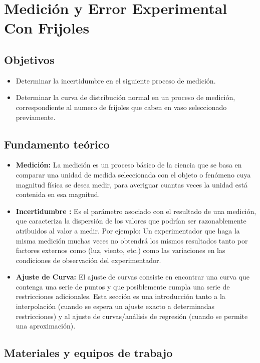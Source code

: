 \section{Medición y Error Experimental Con Frijoles}
\subsection{Objetivos}
\begin{itemize}
    \item Determinar la incertidumbre en el siguiente proceso de medición.
    \item Determinar la curva de distribución normal en un proceso de medición, correspondiente al numero de frijoles que caben en vaso seleccionado previamente.
\end{itemize}

\subsection{Fundamento teórico}
\begin{itemize}
    \item \textbf{Medición:} La medición es un proceso básico de la ciencia que se basa en comparar
una unidad de medida seleccionada con el objeto o fenómeno cuya magnitud física se
desea medir, para averiguar cuantas veces la unidad está contenida en esa magnitud.
    \item \textbf{Incertidumbre :} Es el parámetro asociado con el resultado de una medición, que
caracteriza la dispersión de los valores que podrían ser razonablemente atribuidos al
valor a medir. Por ejemplo: Un experimentador que haga la misma medición muchas
veces no obtendrá los mismos resultados tanto por factores externos como (luz, viento,
etc.) como las variaciones en las condiciones de observación del experimentador.
\item \textbf{Ajuste de Curva: } El ajuste de curvas consiste en encontrar una curva que contenga
una serie de puntos y que posiblemente cumpla una serie de restricciones adicionales.
Esta sección es una introducción tanto a la interpolación (cuando se espera un ajuste
exacto a determinadas restricciones) y al ajuste de curvas/análisis de regresión (cuando
se permite una aproximación).
\end{itemize}
\subsection{Materiales y equipos de trabajo}


